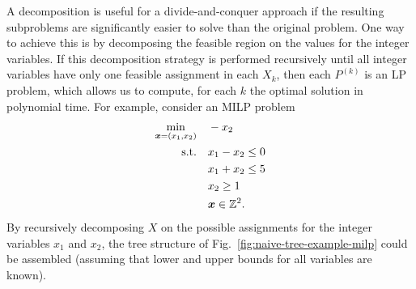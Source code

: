 A decomposition is useful for a divide-and-conquer approach if the resulting subproblems are significantly easier to solve than the original problem.
One way to achieve this is by decomposing the feasible region on the values for the integer variables.
If this decomposition strategy is performed recursively until all integer variables have only one feasible assignment in each $X_k$, then each $P^{(k)}$ is an LP problem, which allows us to compute, for each $k$ the optimal solution in polynomial time.
For example, consider an MILP problem
\begin{equation}\label{eq:example-milp}
\begin{split}
    \min_{\bm{x}=(x_1,x_2)} \quad & -x_2 \\
    \textrm{s.t.} \quad & x_1 - x_2\le 0 \\
      & x_1+x_2 \le 5 \\
      & x_2 \ge 1 \\
      & \bm{x} \in \mathbb{Z}^2
.\end{split}
\end{equation}
By recursively decomposing $X$ on the possible assignments for the integer variables $x_1$ and $x_2$, the tree structure of Fig.~\ref{fig:naive-tree-example-milp} could be assembled (assuming that lower and upper bounds for all variables are known).

